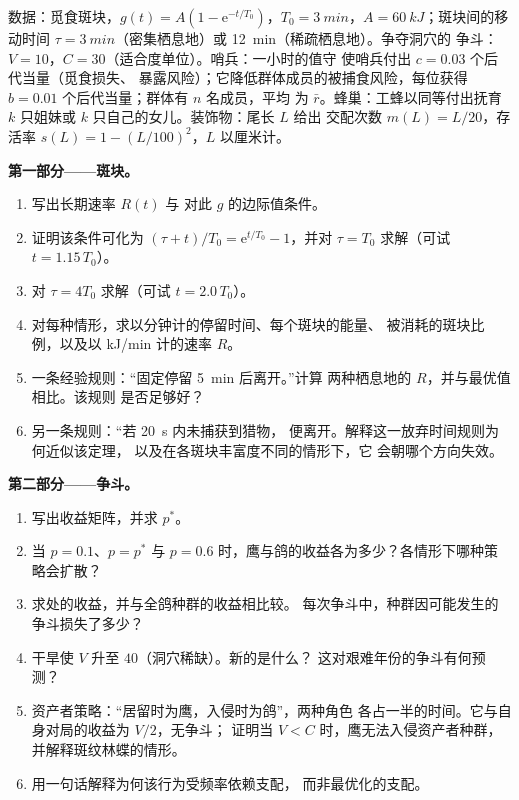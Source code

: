 \begin{problem}
\label{pb:b3:behavioural-ecology:1}
数据：觅食斑块，$g(t) = A(1 - \mathrm{e}^{-t/T_{0}})$，$T_{0}
= \qty{3}{min}$，$A = \qty{60}{kJ}$；斑块间的移动时间 $\tau =
\qty{3}{min}$（密集栖息地）或 \qty{12}{min}（稀疏栖息地）。争夺洞穴的
争斗：$V = 10$，$C = 30$（适合度单位）。哨兵：一小时的值守
使哨兵付出 $c = 0.03$ 个后代当量（觅食损失、
暴露风险）；它降低群体成员的被捕食风险，每位获得 $b = 0.01$
个后代当量；群体有 $n$ 名成员，平均
为 $\bar r$。蜂巢：工蜂以同等付出抚育 $k$ 只姐妹或 $k$
只自己的女儿。装饰物：尾长 $L$ 给出
交配次数 $m(L) = L/20$，存活率 $s(L) = 1 - (L/100)^{2}$，$L$ 以厘米计。

\medskip
\noindent\textbf{第一部分——斑块。}
\begin{enumerate}
  \item 写出长期速率 $R(t)$ 与
        对此 $g$ 的边际值条件。
  \item 证明该条件可化为 $(\tau + t)/T_{0} = \mathrm{e}^{t/T_{0}}
        - 1$，并对 $\tau = T_{0}$ 求解（可试 $t = 1.15\,T_{0}$）。
  \item 对 $\tau = 4T_{0}$ 求解（可试 $t = 2.0\,T_{0}$）。
  \item 对每种情形，求以分钟计的停留时间、每个斑块的能量、
        被消耗的斑块比例，以及以 kJ/min 计的速率 $R$。
  \item 一条经验规则：“固定停留 \qty{5}{min} 后离开。”计算
        两种栖息地的 $R$，并与最优值相比。该规则
        是否足够好？
  \item 另一条规则：“若 \qty{20}{s} 内未捕获到猎物，
        便离开。解释这一放弃时间规则为何近似该定理，
        以及在各斑块丰富度不同的情形下，它
        会朝哪个方向失效。
\end{enumerate}

\medskip
\noindent\textbf{第二部分——争斗。}
\begin{enumerate}[resume]
  \item 写出收益矩阵，并求 $p^{*}$。
  \item 当 $p = 0.1$、$p = p^{*}$ 与 $p =
        0.6$ 时，鹰与鸽的收益各为多少？各情形下哪种策略会扩散？
  \item 求处的收益，并与全鸽种群的收益相比较。
        每次争斗中，种群因可能发生的
        争斗损失了多少？
  \item 干旱使 $V$ 升至 $40$（洞穴稀缺）。新的是什么？
        这对艰难年份的争斗有何预测？
  \item 资产者策略：“居留时为鹰，入侵时为鸽”，两种角色
        各占一半的时间。它与自身对局的收益为 $V/2$，无争斗；
        证明当 $V
        < C$ 时，鹰无法入侵资产者种群，并解释斑纹林蝶的情形。
  \item 用一句话解释为何该行为受频率依赖支配，
        而非最优化的支配。
\end{enumerate}


\end{problem}
